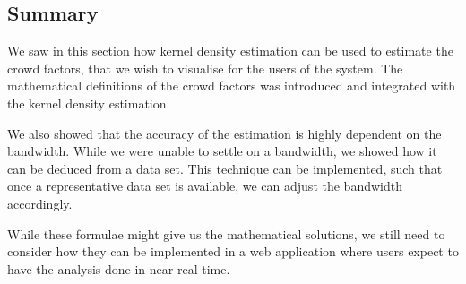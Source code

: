 \subsection{Summary}

We saw in this section how kernel density estimation can be used to estimate the crowd factors, that we wish to visualise for the users of the system. The mathematical definitions of the crowd factors was introduced and integrated with the kernel density estimation.

We also showed that the accuracy of the estimation is highly dependent on the bandwidth. While we were unable to settle on a bandwidth, we showed how it can be deduced from a data set. This technique can be implemented, such that once a representative data set is available, we can adjust the bandwidth accordingly.

While these formulae might give us the mathematical solutions, we still need to consider how they can be implemented in a web application where users expect to have the analysis done in near real-time.





